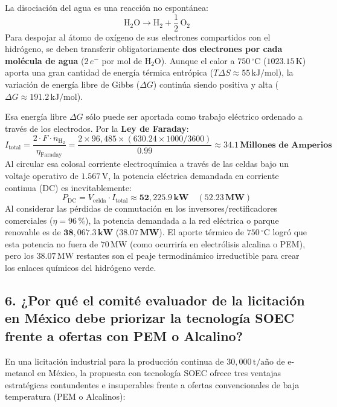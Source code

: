 \documentclass[11pt,a4paper]{article}
\begin{document}
La disociación del agua es una reacción no espontánea:
\begin{equation}
    \text{H}_2\text{O} \longrightarrow \text{H}_2 + \frac{1}{2}\,\text{O}_2
\end{equation}
Para despojar al átomo de oxígeno de sus electrones compartidos con el hidrógeno, se deben transferir obligatoriamente \textbf{dos electrones por cada molécula de agua} ($2\,e^-$ por mol de $\text{H}_2\text{O}$). Aunque el calor a $750\,^\circ\text{C}$ ($1023.15\,\text{K}$) aporta una gran cantidad de energía térmica entrópica ($T\Delta S \approx 55\,\text{kJ/mol}$), la variación de energía libre de Gibbs ($\Delta G$) continúa siendo positiva y alta ($\Delta G \approx 191.2\,\text{kJ/mol}$).

Esa energía libre $\Delta G$ sólo puede ser aportada como trabajo eléctrico ordenado a través de los electrodos. Por la \textbf{Ley de Faraday}:
\begin{equation}
    I_{\text{total}} = \frac{2 \cdot F \cdot \dot{n}_{\text{H}_2}}{\eta_{\text{Faraday}}} = \frac{2 \times 96{,}485 \times (630.24 \times 1000 / 3600)}{0.99} \approx \mathbf{34.1\,\text{Millones de Amperios}}
\end{equation}
Al circular esa colosal corriente electroquímica a través de las celdas bajo un voltaje operativo de $1.567\,\text{V}$, la potencia eléctrica demandada en corriente continua (DC) es inevitablemente:
\begin{equation}
    P_{\text{DC}} = V_{\text{celda}} \cdot I_{\text{total}} \approx \mathbf{52{,}225.9\,\text{kW}} \quad (\mathbf{52.23\,\text{MW}})
\end{equation}
Al considerar las pérdidas de conmutación en los inversores/rectificadores comerciales ($\eta = 96\,\%$), la potencia demandada a la red eléctrica o parque renovable es de $\mathbf{38{,}067.3\,\text{kW}}$ ($\mathbf{38.07\,\text{MW}}$). El aporte térmico de $750\,^\circ\text{C}$ logró que esta potencia no fuera de $70\,\text{MW}$ (como ocurriría en electrólisis alcalina o PEM), pero los $38.07\,\text{MW}$ restantes son el peaje termodinámico irreductible para crear los enlaces químicos del hidrógeno verde.

\subsection{6. ¿Por qué el comité evaluador de la licitación en México debe priorizar la tecnología SOEC frente a ofertas con PEM o Alcalino?}
En una licitación industrial para la producción continua de $30{,}000\,\text{t/año}$ de e-metanol en México, la propuesta con tecnología SOEC ofrece tres ventajas estratégicas contundentes e insuperables frente a ofertas convencionales de baja temperatura (PEM o Alcalinos):
\end{document}
